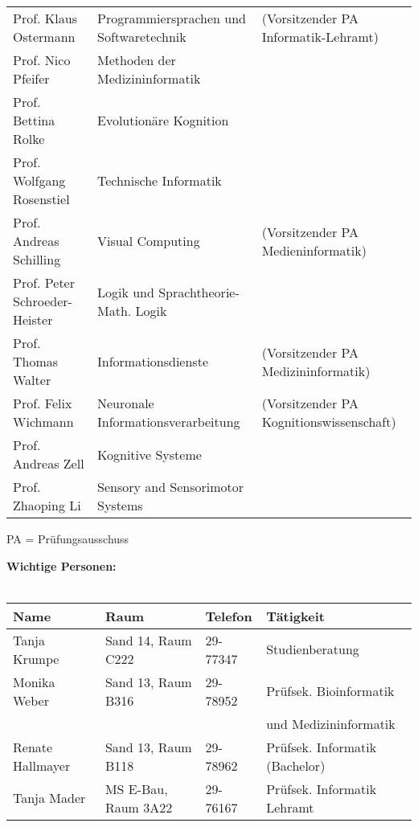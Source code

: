 \begin{tabular}{|lll|}
Prof. Klaus Ostermann	      & Programmiersprachen und Softwaretechnik &(Vorsitzender PA Informatik-Lehramt) \\
Prof. Nico Pfeifer			  & Methoden der Medizininformatik &\\
Prof. Bettina Rolke 		  & Evolutionäre Kognition &\\
Prof. Wolfgang Rosenstiel     & Technische Informatik			 &\\
Prof. Andreas Schilling       & Visual Computing &(Vorsitzender PA Medieninformatik)\\
Prof. Peter Schroeder-Heister & Logik und Sprachtheorie-Math. Logik & \\
Prof. Thomas Walter           & Informationsdienste			 & (Vorsitzender PA Medizininformatik) \\
Prof. Felix Wichmann          & Neuronale Informationsverarbeitung &  (Vorsitzender PA Kognitionswissenschaft)	\\
Prof. Andreas Zell            & Kognitive Systeme 		 &\\
Prof. Zhaoping Li			  & Sensory and Sensorimotor Systems &\\
\hline
\end{tabular}
\scriptsize{PA = Prüfungsausschuss}


\textbf{Wichtige Personen:}\\\\
\begin{tabular}{|llll|}
\hline
Name                  & Raum		       & Telefon    & Tätigkeit \hfill\\
\hline
\hline
Tanja Krumpe	      & Sand 14, Raum C222    & 29-77347   & Studienberatung\\
Monika Weber          & Sand 13, Raum B316    & 29-78952   & Prüfsek. Bioinformatik\\
                      &                       &            & und Medizininformatik \\
Renate Hallmayer      & Sand 13, Raum B118    & 29-78962   & Prüfsek. Informatik (Bachelor) \\
Tanja Mader      & MS E-Bau, Raum 3A22    & 29-76167   & Prüfsek. Informatik Lehramt \\
\hline
\end{tabular} \\


